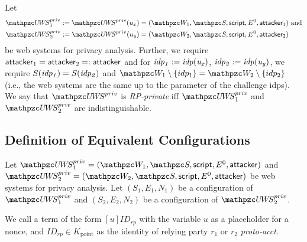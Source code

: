   \begin{definition}[RP-Privacy]\label{def:rp-privacy}
    Let 
    \begin{align*}
      \uppressoprivwebsystem_1 := \uppressoprivwebsystem(u_x) =
      (\bidsystem_1, \scriptset, \mathsf{script}, E^0, \fAP{attacker}_1)&\text{ and}\\
      \uppressoprivwebsystem_2 := \uppressoprivwebsystem(u_y) =
      (\bidsystem_2, \scriptset, \mathsf{script}, E^0, \fAP{attacker}_2)&
    \end{align*}
    be \uppresso web systems for privacy analysis. 
    Further, we require $\mathsf{attacker}_1 = \mathsf{attacker}_2 =: \mathsf{attacker}$ 
    and for $\mathit{idp_1} := \mathit{idp(u_x)}$, $\mathit{idp_2} := \mathit{idp(u_y)}$, 
    we require $S(\mathit{idp_1}) = S(\mathit{idp_2})$ and $\bidsystem_1 \setminus \{idp_1\} = \bidsystem_2 \setminus \{idp_2\}$ 
    (i.e., the web systems are the same up to the parameter of the challenge idps).  
    We say that $\uppressoprivwebsystem$ is \emph{RP-private} iff $\uppressoprivwebsystem_1$ and $\uppressoprivwebsystem_2$ are indistinguishable.
  \end{definition}
  
  \subsection{Definition of Equivalent Configurations}\label{app:rp:defin-equiv-stat}
  
  Let $\uppressoprivwebsystem_1 = (\bidsystem_1, \scriptset, \mathsf{script}, E^0, \fAP{attacker})$ 
  and $\uppressoprivwebsystem_2 = (\bidsystem_2, \scriptset, \mathsf{script}, E^0, \fAP{attacker})$ 
  be \uppresso web systems for privacy analysis. 
  Let $(S_1,E_1,N_1)$ be a configuration of $\uppressoprivwebsystem_1$ 
  and $(S_2,E_2,N_2)$ be a configuration of $\uppressoprivwebsystem_2$.
  
  \begin{definition}
    We call a term of the form $[u]ID_{rp}$ with the variable
    $u$ as a placeholder for a nonce, and 
    $ID_{rp}\in K_\text{point}$ as the identity of 
    relying party $r_1$ or $r_2$ \emph{proto-acct}.
  \end{definition}
  
